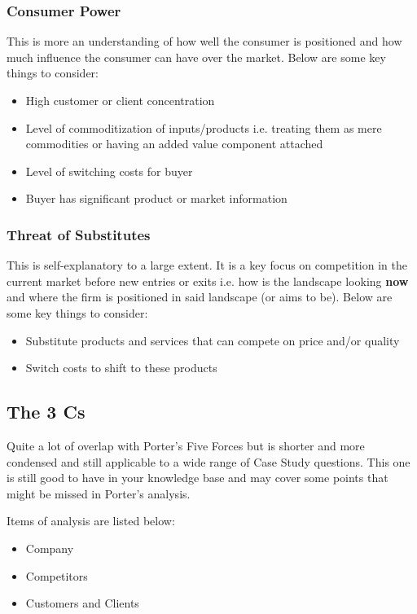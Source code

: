 \documentclass[a4paper]{article}
\begin{document}
{\subsubsection{Consumer Power}
This is more an understanding of how well the consumer is positioned and how much influence the consumer can have over the market. Below are some key things to consider:

\begin{itemize}
	\item High customer or client concentration
	\item Level of commoditization of inputs/products i.e. treating them as mere commodities or having an added value component attached
	\item Level of switching costs for buyer
	\item Buyer has significant product or market information
\end{itemize}

\subsubsection{Threat of Substitutes}
This is self-explanatory to a large extent. It is a key focus on competition in the current market before new entries or exits i.e. how is the landscape looking \textbf{now} and where the firm is positioned in said landscape (or aims to be). Below are some key things to consider:

\begin{itemize}
	\item Substitute products and services that can compete on price and/or quality
	\item Switch costs to shift to these products
\end{itemize}

\subsection{The 3 Cs}
Quite a lot of overlap with Porter's Five Forces but is shorter and more condensed and still applicable to a wide range of Case Study questions. This one is still good to have in your knowledge base and may cover some points that might be missed in Porter's analysis.

\vspace{5pt}
\noindent Items of analysis are listed below:
\begin{itemize}
	\item Company
	\item Competitors
	\item Customers and Clients
\end{itemize}

}
\end{document}
